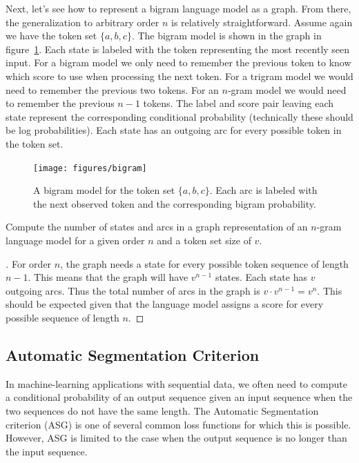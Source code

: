 Next, let's see how to represent a bigram language model as a graph. From
there, the generalization to arbitrary order $n$ is relatively straightforward.
Assume again we have the token set $\{a, b, c\}$. The bigram model is shown in
the graph in figure~\ref{fig:bigram}. Each state is labeled with the token
representing the most recently seen input.  For a bigram model we only need to
remember the previous token to know which score to use when processing the next
token. For a trigram model we would need to remember the previous two tokens.
For an $n$-gram model we would need to remember the previous $n-1$ tokens. The
label and score pair leaving each state represent the corresponding conditional
probability (technically these should be log probabilities). Each state has an
outgoing arc for every possible token in the token set.

\begin{figure}
    \centering
    \texttt{[image: figures/bigram]}
    \caption{A bigram model for the token set $\{a, b, c\}$. Each arc is
    labeled with the next observed token and the corresponding bigram
    probability.}
    \label{fig:bigram}
\end{figure}

\begin{example}
\label{ex:ngram}
Compute the number of states and arcs in a graph representation of an $n$-gram
language model for a given order $n$ and a token set size of $v$.
\end{example}

\begin{proof}[\unskip\nopunct]
For order $n$, the graph needs a state for every possible token sequence of
length $n-1$. This means that the graph will have $v^{n-1}$ states. Each state
has $v$ outgoing arcs. Thus the total number of arcs in the graph is $v \cdot
v^{n-1}= v^n$. This should be expected given that the language model assigns a
score for every possible sequence of length $n$.
\end{proof}

\subsection{Automatic Segmentation Criterion}

In machine-learning applications with sequential data, we often need to compute
a conditional probability of an output sequence given an input sequence when
the two sequences do not have the same length. The Automatic Segmentation
criterion (ASG) is one of several common loss functions for which this is
possible. However, ASG is limited to the case when the output sequence is no
longer than the input sequence.

